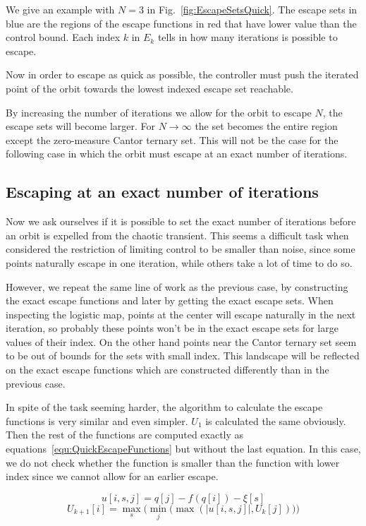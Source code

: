 We give an example with $N=3$ in Fig.~\ref{fig:EscapeSetsQuick}. The escape sets in blue are the regions of the escape functions in red that have lower value than the control bound. Each index $k$ in $E_k$ tells in how many iterations is possible to escape. 

Now in order to escape as quick as possible, the controller must push the iterated point of the orbit towards the lowest indexed escape set reachable. 

By increasing the number of iterations we allow for the orbit to escape $N$, the escape sets will become larger. For $N\to\infty$ the set becomes the entire region except the zero-measure Cantor ternary set. This will not be the case for the following case in which the orbit must escape at an exact number of iterations.


\subsection{Escaping at an exact number of iterations}

Now we ask ourselves if it is possible to set the exact number of iterations before an orbit is expelled from the chaotic transient. This seems a difficult task when considered the restriction of limiting control to be smaller than noise, since some points naturally escape in one iteration, while others take a lot of time to do so. 

However, we repeat the same line of work as the previous case, by constructing the exact escape functions and later by getting the exact escape sets. When inspecting the logistic map, points at the center will escape naturally in the next iteration, so probably these points won't be in the exact escape sets for large values of their index. On the other hand points near the Cantor ternary set seem to be out of bounds for the sets with small index. This landscape will be reflected on the exact escape functions which are constructed differently than in the previous case.

In spite of the task seeming harder, the algorithm to calculate the escape functions is very similar and even simpler. $U_1$ is calculated the same obviously. Then the rest of the functions are computed exactly as equations~\ref{equ:QuickEscapeFunctions} but without the last equation. In this case, we do not check whether the function is smaller than the function with lower index since we cannot allow for an earlier escape.

\begin{equation*}
u[i,s,j] = q[j] - f(q[i]) - \xi[s]
\end{equation*}
\begin{equation}
U_{k+1}[i]=\max_s\Big(\min_j\big(\max(|u[i,s,j]|,U_k[j])\big)\Big)
\label{equ:ExactEscapeFunctions}
\end{equation}





